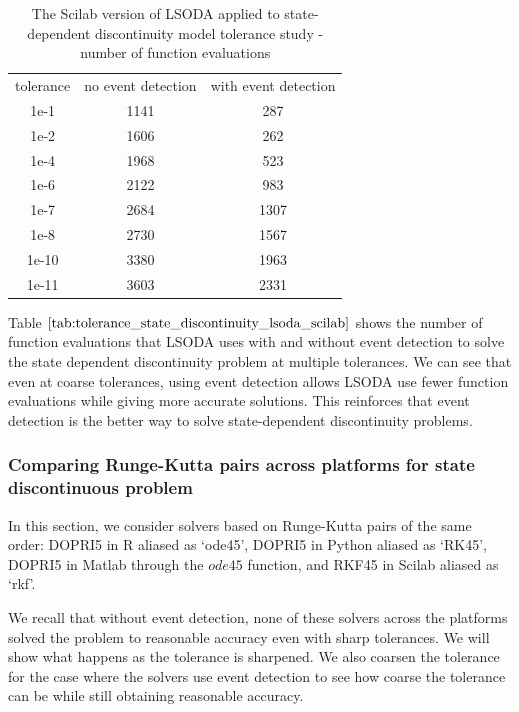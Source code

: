 \begin{table}[h]
\caption {The Scilab version of LSODA applied to state-dependent discontinuity model tolerance study - number of function evaluations} \label{tab:tolerance_state_discontinuity_lsoda_scilab} 
\begin{center}
\begin{tabular}{ c c c }
tolerance & no event detection & with event detection \\
1e-1 & 1141 & 287 \\
1e-2 & 1606 & 262 \\
1e-4 & 1968 & 523 \\
1e-6 & 2122 & 983 \\
1e-7 & 2684 & 1307 \\
1e-8 & 2730 & 1567 \\
1e-10 & 3380 & 1963 \\
1e-11 & 3603 & 2331 \\
\end{tabular}
\end{center}
\end{table}

Table $\ref{tab:tolerance_state_discontinuity_lsoda_scilab}$ shows the number of function evaluations that LSODA uses with and without event detection to solve the state dependent discontinuity problem at multiple tolerances. We can see that even at coarse tolerances, using event detection allows LSODA use fewer function evaluations while giving more accurate solutions. This reinforces that event detection is the better way to solve state-dependent discontinuity problems. 

\subsubsection{Comparing Runge-Kutta pairs across platforms for state discontinuous problem}
In this section, we consider solvers based on Runge-Kutta pairs of the same order: DOPRI5 in R aliased as `ode45', DOPRI5 in Python aliased as `RK45', DOPRI5 in Matlab through the $ode45$ function, and RKF45 in Scilab aliased as `rkf'.

We recall that without event detection, none of these solvers across the platforms solved the problem to reasonable accuracy even with sharp tolerances. We will show what happens as the tolerance is sharpened. We also coarsen the tolerance for the case where the solvers use event detection to see how coarse the tolerance can be while still obtaining reasonable accuracy.

